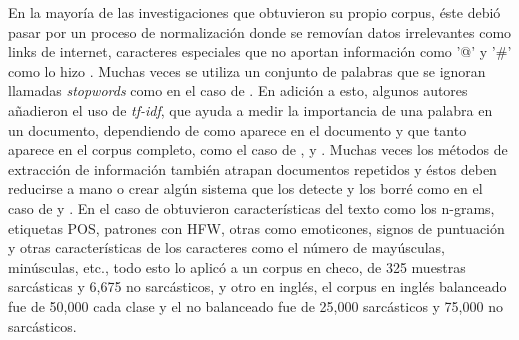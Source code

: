 \par En la mayoría de las investigaciones que obtuvieron su propio corpus, éste debió pasar por un proceso de normalización donde se removían datos irrelevantes como links de internet, caracteres especiales que no aportan información como '@' y '\#' como lo hizo \cite{lopez2016character}. Muchas veces se utiliza un conjunto de palabras que se ignoran llamadas \textit{\gls{stopwords}} como en el caso de \cite{reyes2012making}. En adición a esto, algunos autores añadieron el uso de \textit{\gls{tf-idf}}, que ayuda a medir la importancia de una palabra en un documento, dependiendo de como aparece en el documento y que tanto aparece en el corpus completo, como el caso de \cite{reyes2012making}, \cite{wallace2015sparse} y \cite{bamman2015contextualized}. Muchas veces los métodos de extracción de información también atrapan documentos repetidos y éstos deben reducirse a mano o crear algún sistema que los detecte y los borré como en el caso de \cite{charalampakis2015detecting} y \cite{reyes2012making}. En el caso de \cite{ptavcek2014sarcasm} obtuvieron características del texto como los \gls{n-grams}, etiquetas \gls{POS}, patrones con \gls{HFW}, otras como emoticones, signos de puntuación y otras características de los caracteres como el número de mayúsculas, minúsculas, etc., todo esto lo aplicó a un corpus en checo, de 325 muestras sarcásticas y 6,675 no sarcásticos, y otro en inglés, el corpus en inglés balanceado fue de 50,000 cada clase y el no balanceado fue de 25,000 sarcásticos y 75,000 no sarcásticos.
